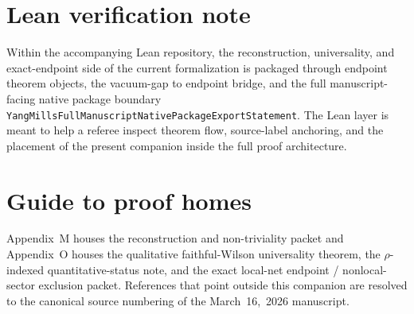 \documentclass[preprint,aip,jmp,amsmath,amssymb,nofootinbib]{revtex4-2}
\begin{document}
\begin{abstract}
This companion is the proof home for the endpoint packet of the theorem-level local-net / vacuum-sector claim. It proves the Euclidean OS dossier, Wightman--Haag--Kastler reconstruction, field correspondence, Minkowski-gap transfer, non-triviality, the qualitative faithful-Wilson universality theorem, and the exact bounded-region local-net endpoint. Throughout, the theorem-level object is the local gauge-invariant sharp-local net generated by flowed curvature composites together with its OS/Wightman vacuum representation; within the admissible gradient-flow renormalization class and after coherent normalization, faithful Wilson regularizations yield the same continuum local theory, while the explicit Route~1 quantitative ledger remains $\rho$-indexed. Extended-support line/surface sectors and other nonlocal sector data remain outside the theorem-level claim. External theorem and appendix references are resolved to the canonical source numbering so that the appendix text can be read in the same numbering regime as the original manuscript.
\end{abstract}
\maketitle
\section*{Lean verification note}
Within the accompanying Lean repository, the reconstruction, universality, and
exact-endpoint side of the current formalization is packaged through endpoint
theorem objects, the vacuum-gap to endpoint bridge, and the full
manuscript-facing native package boundary
\texttt{YangMillsFullManuscriptNativePackageExportStatement}. The Lean layer is
meant to help a referee inspect theorem flow, source-label anchoring, and the
placement of the present companion inside the full proof architecture.

\section*{Guide to proof homes}
Appendix~M houses the reconstruction and non-triviality packet and Appendix~O houses the qualitative faithful-Wilson universality theorem, the $\rho$-indexed quantitative-status note, and the exact local-net endpoint / nonlocal-sector exclusion packet. References that point outside this companion are resolved to the canonical source numbering of the March~16,~2026 manuscript.
\end{document}
